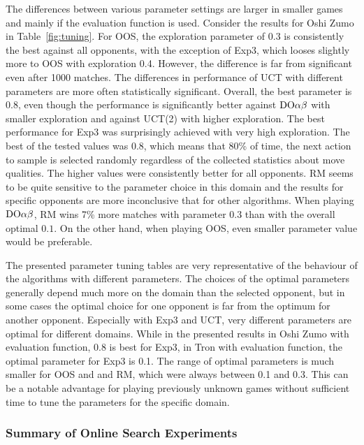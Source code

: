 The differences between various parameter settings are larger in smaller games and mainly if the evaluation function is used.
Consider the  results for Oshi Zumo in Table~\ref{fig:tuning}.
For OOS, the exploration parameter of $0.3$ is consistently the best against all opponents, with the exception of Exp3, which looses slightly more to OOS with exploration 0.4.
However, the difference is far from significant even after 1000 matches.
The differences in performance of UCT with different parameters are more often statistically significant.
Overall, the best parameter is 0.8, even though the performance is significantly better against $\textrm{DO}\alpha\beta$ with smaller exploration and against UCT(2) with higher exploration.
The best performance for Exp3 was surprisingly achieved with very high exploration. The best of the tested values was 0.8, which means that 80\% of time, the next action to sample is selected randomly regardless of the collected statistics about move qualities.
The higher values were consistently better for all opponents.
RM seems to be quite sensitive to the parameter choice in this domain and the results for specific opponents are more inconclusive that for other algorithms.
When playing $\textrm{DO}\alpha\beta$, RM wins 7\% more  matches with parameter $0.3$ than with the overall optimal $0.1$.
On the other hand, when playing OOS, even smaller parameter value would be preferable.

The presented parameter tuning tables are very representative of the behaviour of the algorithms with different parameters. The choices of the optimal parameters generally depend much more on the domain than the selected opponent, but in some cases the optimal choice for one opponent is far from the optimum for another opponent.  Especially with Exp3 and UCT, very different parameters are optimal for different domains.
While in the presented results in Oshi Zumo with evaluation function, 0.8 is best for Exp3, in Tron with evaluation function, the optimal parameter for Exp3 is 0.1.
The range of optimal parameters is much smaller for OOS and and RM, which were always between 0.1 and 0.3. This can be a notable advantage for playing previously unknown games without sufficient time to tune the parameters for the specific domain.

\subsubsection{Summary of Online Search Experiments}

